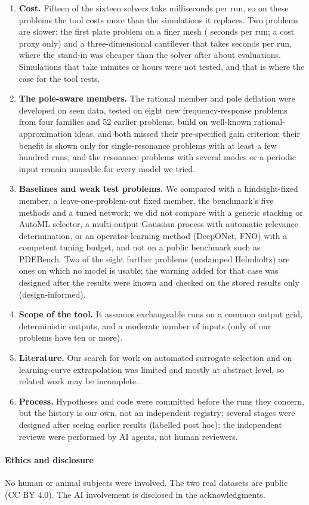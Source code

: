 \begin{enumerate}
\item \textbf{Cost.} Fifteen of the sixteen solvers take milliseconds per run, so on these problems the tool costs more than the simulations it replaces. Two problems are slower: the first plate problem on a finer mesh (\SvETsim{} seconds per run; a cost proxy only) and a three-dimensional cantilever that takes \SeTsim{} seconds per run, where the stand-in was cheaper than the solver after about \SeBreakWith{} evaluations. Simulations that take minutes or hours were not tested, and that is where the case for the tool rests.
\item \textbf{The pole-aware members.} The rational member and pole deflation were developed on seen data, tested on eight new frequency-response problems from four families and 52 earlier problems, build on well-known rational-approximation ideas, and both missed their pre-specified gain criterion; their benefit is shown only for single-resonance problems with at least a few hundred runs, and the resonance problems with several modes or a periodic input remain unusable for every model we tried.
\item \textbf{Baselines and weak test problems.} We compared with a hindsight-fixed member, a leave-one-problem-out fixed member, the benchmark's five methods and a tuned network; we did not compare with a generic stacking or AutoML selector, a multi-output Gaussian process with automatic relevance determination, or an operator-learning method (DeepONet, FNO) with a competent tuning budget, and not on a public benchmark such as PDEBench. Two of the eight further problems (undamped Helmholtz) are ones on which no model is usable; the warning added for that case was designed after the results were known and checked on the stored results only (design-informed).
\item \textbf{Scope of the tool.} It assumes exchangeable runs on a common output grid, deterministic outputs, and a moderate number of inputs (only \NHighP{} of our \NAllProblems{} problems have ten or more).
\item \textbf{Literature.} Our search for work on automated surrogate selection and on learning-curve extrapolation was limited and mostly at abstract level, so related work may be incomplete.
\item \textbf{Process.} Hypotheses and code were committed before the runs they concern, but the history is our own, not an independent registry; several stages were designed after seeing earlier results (labelled post hoc); the independent reviews were performed by AI agents, not human reviewers.
\end{enumerate}
\paragraph{Ethics and disclosure} No human or animal subjects were involved. The two real datasets are public (CC BY 4.0). The AI involvement is disclosed in the acknowledgments.

